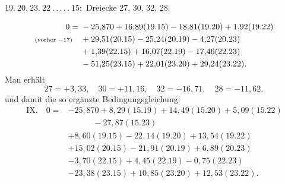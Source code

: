 \par\bigskip
\begin{center}
$19.\ 20.\ 23.\ 22\ .\,.\,.\,.\,.\ 15;$ Dreiecke 27, 30, 32, 28.
\end{center}
\[
\begin{aligned}
0={}&-25{,}870+16{,}89(19.15)-18{,}81(19.20)+1{,}92(19.22)\\
\text{\scriptsize(vorher $-17$)}\quad&+29{,}51(20.15)-25{,}24(20.19)-4{,}27(20.23)\\
&+1{,}39(22.15)+16{,}07(22.19)-17{,}46(22.23)\\
&-51{,}25(23.15)+22{,}01(23.20)+29{,}24(23.22).
\end{aligned}
\]
Man erhält
\[
27=+3{,}33,\quad30=+11{,}16,\quad32=-16{,}71,\quad28=-11{,}62,
\]
und damit die so ergänzte Bedingungsgleichung:
\[
\begin{aligned}
\mathrm{IX.}\quad0={}&-25{,}870+8{,}29(15.19)+14{,}49(15.20)+5{,}09(15.22)\\
&\qquad\quad-27{,}87(15.23)\\
&+8{,}60(19.15)-22{,}14(19.20)+13{,}54(19.22)\\
&+15{,}02(20.15)-21{,}91(20.19)+6{,}89(20.23)\\
&-3{,}70(22.15)+4{,}45(22.19)-0{,}75(22.23)\\
&-23{,}38(23.15)+10{,}85(23.20)+12{,}53(23.22).
\end{aligned}
\]
